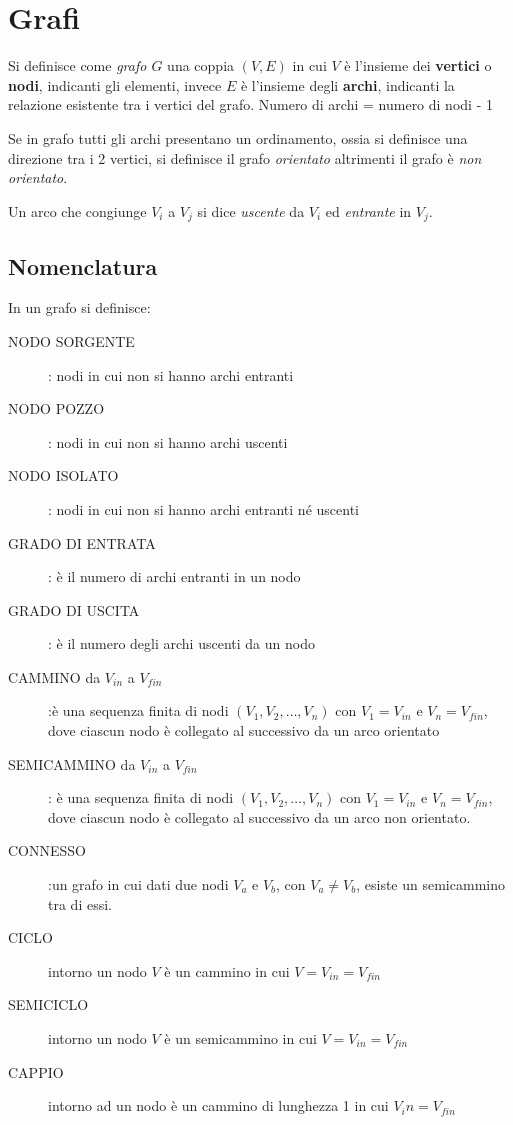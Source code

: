 \section{Grafi}
Si definisce come \emph{grafo $G$} una coppia $(V,E)$ in cui $V$ è l'insieme
dei \textbf{vertici} o \textbf{nodi}, indicanti gli elementi, invece $E$
 è l'insieme degli \textbf{archi}, indicanti la relazione esistente tra i vertici del grafo.\newline
Numero di archi = numero di nodi - 1

Se in grafo tutti gli archi presentano un ordinamento, ossia si definisce una direzione
tra i 2 vertici, si definisce il grafo \emph{orientato} altrimenti il grafo è \emph{non orientato}.

Un arco che congiunge $V_i$ a $V_j$ si dice \emph{uscente} da $V_i$ ed \emph{entrante} in $V_j$.

\subsection{Nomenclatura}
In un grafo si definisce:
\begin{description}
    \item[NODO SORGENTE]: nodi in cui non si hanno archi entranti
    \item[NODO POZZO]: nodi in cui non si hanno archi uscenti
    \item[NODO ISOLATO]: nodi in cui non si hanno archi entranti né uscenti
    \item[GRADO DI ENTRATA]: è il numero di archi entranti in un nodo
    \item[GRADO DI USCITA]: è il numero degli archi uscenti da un nodo
    \item[CAMMINO da $V_{in}$ a $V_{fin}$]:è una sequenza finita di nodi $(V_1,V_2,\dots,V_n)$
     con $V_1 = V_{in}$ e $V_n = V_{fin}$, dove ciascun nodo è collegato al successivo da un arco orientato
    \item[SEMICAMMINO da $V_{in}$ a $V_{fin}$]: è una sequenza finita di nodi
     $(V_1,V_2,\dots,V_n)$ con $V_1 = V_{in}$ e $V_n = V_{fin}$, dove ciascun nodo
     è collegato al successivo da un arco non orientato.
    \item[CONNESSO]:un grafo in cui dati due nodi $V_a$ e $V_b$, con $V_a \neq V_b$,
                    esiste un semicammino tra di essi.
    \item[CICLO]intorno un nodo $V$ è un cammino in cui $V = V_{in} = V_{fin}$
    \item[SEMICICLO]intorno un nodo $V$ è un semicammino in cui $V = V_{in} = V_{fin}$
    \item[CAPPIO]intorno ad un nodo è un cammino di lunghezza 1 in cui $V_in = V_{fin}$
\end{description}


